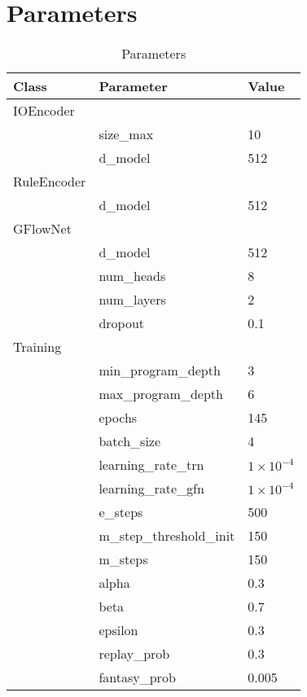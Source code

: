 \clearpage
\section{Parameters}
\begin{table}[h!]
    \centering
    \begin{tabularx}{\textwidth}{|l|l|X|}
    \hline
    \textbf{Class} & \textbf{Parameter} & \textbf{Value} \\
    \hline
    IOEncoder &  &  \\
     & size\_max & 10 \\
     & d\_model & 512 \\
    \hline
    RuleEncoder & & \\
     & d\_model & 512 \\
    \hline
    GFlowNet &  & \\
     & d\_model & 512 \\
     & num\_heads & 8 \\
     & num\_layers & 2 \\
     & dropout & 0.1 \\
    \hline
    Training & & \\
     & min\_program\_depth & 3 \\
     & max\_program\_depth & 6 \\
     & epochs & 145 \\
     & batch\_size & 4 \\
     & learning\_rate\_trn & $1 \times 10^{-4}$ \\
     & learning\_rate\_gfn & $1 \times 10^{-4}$ \\
     & e\_steps & 500 \\
     & m\_step\_threshold\_init & 150 \\
     & m\_steps & 150 \\
     & alpha & 0.3 \\
     & beta & 0.7 \\
     & epsilon & 0.3 \\
     & replay\_prob & 0.3 \\
     & fantasy\_prob & 0.005 \\

    \hline
    \end{tabularx}
    \caption{Parameters}
    \label{table:params}
    \end{table}